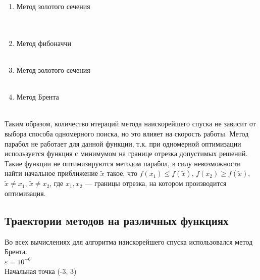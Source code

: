 \begin{enumerate}
	\item Метод золотого сечения \\
	      \\
	       \\
	\item Метод фибоначчи \\
	      \\
	\item Метод золотого сечения \\
	      \\
	\item Метод Брента \\
	      \\
\end{enumerate}

Таким образом, количество итераций метода наискорейшего спуска не зависит от выбора способа одномерного поиска, но это влияет на скорость работы. Метод парабол не работает для данной функции, т.к. при одномерной оптимизации используется функция с минимумом на границе отрезка допустимых решений. Такие функции не оптимизируются методом парабол, в силу невозможности найти начальное приближение \(\tilde{x}\) такое, что \(f(x_1) \leq f(\tilde{x})\), \(f(x_2) \geq f(\tilde{x})\), \(\tilde{x} \neq x_1\), \(\tilde{x} \neq x_2\), где \(x_1, x_2\) --- границы отрезка, на котором производится оптимизация.

\subsection{Траектории методов на различных функциях}
Во всех вычислениях для алгоритма наискорейшего спуска использовался метод Брента.\\
$\varepsilon = 10^{-6}$ \\
Начальная точка (-3, 3) \\

